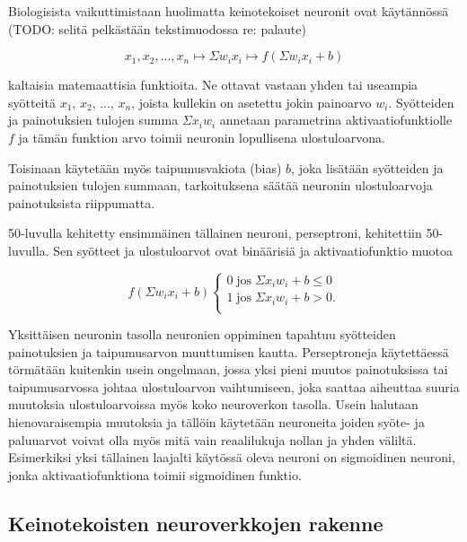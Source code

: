 \documentclass[finnish]{tktltiki2}
\theoremstyle{definition}
\theoremstyle{remark}
\begin{document}
    Biologisista vaikuttimistaan huolimatta keinotekoiset neuronit ovat käytännössä (TODO: selitä pelkästään tekstimuodossa re: palaute)

     $$ x_1, x_2, ..., x_n \mapsto \Sigma w_i x_i \mapsto f(\Sigma w_i x_i + b) $$

    kaltaisia matemaattisia funktioita. Ne ottavat vastaan yhden tai useampia syötteitä $x_1$, $x_2$, ..., $x_n$, joista kullekin on asetettu jokin painoarvo $w_i$. Syötteiden ja painotuksien tulojen summa $\Sigma x_i w_i$ annetaan parametrina aktivaatiofunktiolle $f$ ja tämän funktion arvo toimii neuronin lopullisena ulostuloarvona.

    Toisinaan käytetään myös taipumusvakiota (bias) $b$, joka lisätään syötteiden ja painotuksien tulojen summaan, tarkoituksena säätää neuronin ulostuloarvoja painotuksista riippumatta.

    50-luvulla kehitetty ensimmäinen tällainen neuroni, perseptroni, kehitettiin 50-luvulla. Sen syötteet ja ulostuloarvot ovat binäärisiä ja aktivaatiofunktio muotoa

    \begin{equation}
      f(\Sigma w_i x_i + b)
      \begin{cases}
        0\; \text{jos} \; \Sigma x_i w_i + b \leq 0 \\
        1\; \text{jos} \; \Sigma x_i w_i + b > 0. \\
      \end{cases}
      \label{eq:perceptron}
    \end{equation}

    Yksittäisen neuronin tasolla neuronien oppiminen tapahtuu syötteiden painotuksien ja taipumusarvon muuttumisen kautta. Perseptroneja käytettäessä törmätään kuitenkin usein ongelmaan, jossa yksi pieni muutos painotuksissa tai taipumusarvossa johtaa ulostuloarvon vaihtumiseen, joka saattaa aiheuttaa suuria muutoksia ulostuloarvoissa myös koko neuroverkon tasolla. Usein halutaan hienovaraisempia muutoksia ja tällöin käytetään neuroneita joiden syöte- ja paluuarvot voivat olla myös mitä vain reaalilukuja nollan ja yhden väliltä. Esimerkiksi yksi tällainen laajalti käytössä oleva neuroni on sigmoidinen neuroni, jonka aktivaatiofunktiona toimii sigmoidinen funktio.



  \subsection{Keinotekoisten neuroverkkojen rakenne}
\end{document}

